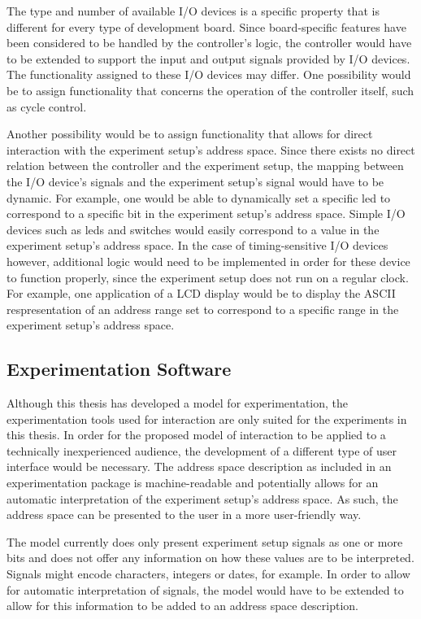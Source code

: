 \documentclass[main.tex]{subfiles}
\begin{document}
The type and number of available I/O devices is a specific property that is different for every type of development board. Since board-specific features have been considered to be handled by the controller's logic, the controller would have to be extended to support the input and output signals provided by I/O devices. The functionality assigned to these I/O devices may differ. One possibility would be to assign functionality that concerns the operation of the controller itself, such as cycle control. 

Another possibility would be to assign functionality that allows for direct interaction with the experiment setup's address space. Since there exists no direct relation between the controller and the experiment setup, the mapping between the I/O device's signals and the experiment setup's signal would have to be dynamic. For example, one would be able to dynamically set a specific led to correspond to a specific bit in the experiment setup's address space. Simple I/O devices such as leds and switches would easily correspond to a value in the experiment setup's address space. In the case of timing-sensitive I/O devices however, additional logic would need to be implemented in order for these device to function properly, since the experiment setup does not run on a regular clock. For example, one application of a LCD display would be to display the ASCII respresentation of an address range set to correspond to a specific range in the experiment setup's address space. 

\subsection{Experimentation Software}
Although this thesis has developed a model for experimentation, the experimentation tools used for interaction are only suited for the experiments in this thesis. In order for the proposed model of interaction to be applied to a technically inexperienced audience, the development of a different type of user interface would be necessary. The address space description as included in an experimentation package is machine-readable and potentially allows for an automatic interpretation of the experiment setup's address space. As such, the address space can be presented to the user in a more user-friendly way. 

The model currently does only present experiment setup signals as one or more bits and does not offer any information on how these values are to be interpreted. Signals might encode characters, integers or dates, for example.  In order to allow for automatic interpretation of signals, the model would have to be extended to allow for this information to be added to an address space description.  
\end{document}
